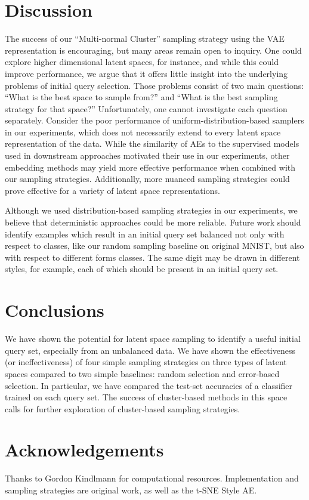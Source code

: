 \documentclass[a4paper]{article}
\begin{document}
\section{Discussion}
\label{sec:discussion}

The success of our ``Multi-normal Cluster'' sampling strategy using the VAE
representation is encouraging, but many areas remain open to inquiry. One could
explore higher dimensional latent spaces, for instance, and while this could
improve performance, we argue that it offers little insight into the underlying
problems of initial query selection. Those problems consist of two main
questions: ``What is the best space to sample from?'' and ``What is the best
sampling strategy for that space?'' Unfortunately, one cannot investigate each
question separately. Consider the poor performance of uniform-distribution-based
samplers in our experiments, which does not necessarily extend to every latent
space representation of the data. While the similarity of AEs to the supervised
models used in downstream approaches motivated their use in our experiments,
other embedding methods may yield more effective performance when combined with
our sampling strategies. Additionally, more nuanced sampling strategies could
prove effective for a variety of latent space representations.

Although we used distribution-based sampling strategies in our experiments, we
believe that deterministic approaches could be more reliable. Future work should
identify examples which result in an initial query set balanced not only with
respect to classes, like our random sampling baseline on original MNIST, but
also with respect to different forms classes. The same digit may be drawn in
different styles, for example, each of which should be present in an initial
query set.

\section{Conclusions}
\label{sec:conclusion}

We have shown the potential for latent space sampling to identify a useful
initial query set, especially from an unbalanced data. We have shown the
effectiveness (or ineffectiveness) of four simple sampling strategies on three
types of latent spaces compared to two simple baselines: random selection and
error-based selection. In particular, we have compared the test-set accuracies
of a classifier trained on each query set. The success of cluster-based methods
in this space calls for further exploration of cluster-based sampling
strategies.

\section{Acknowledgements}
\label{sec:acknowledgements}

Thanks to Gordon Kindlmann for computational resources. Implementation and
sampling strategies are original work, as well as the t-SNE Style AE.

\newpage
\eightpt



\end{document}
